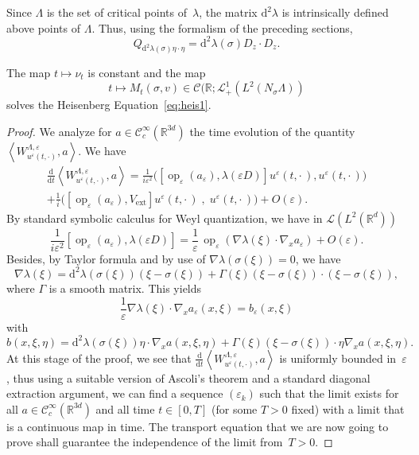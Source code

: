 \documentclass[AHL,Unicode,longabstracts]{cedram}
\DeclareMathOperator{\ext}{ext}
\DeclareMathOperator{\op}{op}
\newcommand*\R{{\mathbb R}}
\newcommand*\eps{\varepsilon}
\numberwithin{equation}{section}
\newcommand*{\dd}{\mathrm{d}}
\newcommand*{\dt}{\dd t}
\begin{document}
Since $\Lambda$ is the set of critical points of~$\lambda$, the matrix $\dd^2 \lambda$ is intrinsically defined above points of $\Lambda$. Thus, using the formalism of the preceding sections,
\[
Q_{\dd^2\lambda(\sigma)\eta\cdot\eta}= \dd^2\lambda(\sigma)D_z\cdot D_z.
\]

\begin{prop}\label{prop5.1}
The map $t\mapsto \nu_t$ is constant and the map
\[
t\mapsto M_t(\sigma,v)\in \mathcal{C}(\R;\mathcal{L}_+^1(L^2(N_\sigma\Lambda))
\]
solves the Heisenberg Equation~\eqref{eq:heis1}.
\end{prop}

\begin{proof}
We analyze for $a\in\mathcal{C}_c^\infty(\R^{3d})$ the time evolution of the quantity\linebreak $\left\langle W^{\Lambda,\eps}_{u^{\eps}(t,\cdot)},a\right\rangle.$ We have
\begin{multline*}
\frac{\dd}{\dt} \left\langle W^{\Lambda,\eps}_{u^{\eps}(t,\cdot)},a\right\rangle=\frac{1}{i\eps^2} \big(\left[\op_\eps(a_\eps),\lambda(\eps D)\right] u^\eps(t,\cdot\,),u^\eps(t,\cdot\,)\big)\\ + \frac{1}{i}
\big(\left[\op_\eps(a_\eps),V_{\ext}\right] u^\eps(t,\cdot\,)\;,\;u^\eps(t,\cdot\,)\big)+O(\eps).
\end{multline*}
By standard symbolic calculus for Weyl quantization, we have in ${\mathcal L}(L^2(\R^d))$
\[
\frac{1}{i\eps^2}\left[\op_\eps(a_\eps),\lambda(\eps D)\right] = \frac{1}{\eps} \,\op_\eps(\nabla\lambda(\xi) \cdot\nabla_x a_\eps) +O(\eps).
\]
Besides, by Taylor formula and by use of $\nabla\lambda (\sigma(\xi))=0$, we have
\begin{equation}\label{taylor_lambda}
\nabla \lambda(\xi) = \dd^2\lambda(\sigma(\xi)) \left(\xi-\sigma(\xi)\right) + \Gamma(\xi) \left(\xi-\sigma(\xi) \right)\cdot\left(\xi-\sigma(\xi)\right),
\end{equation}
where $\Gamma$ is a smooth matrix. This yields
\[
\frac{1}{\eps} \nabla\lambda(\xi) \cdot\nabla_x a_\eps(x,\xi) = b_\eps(x,\xi)
\]
with
\[
b(x,\xi,\eta)=\dd^2\lambda(\sigma(\xi))\eta\cdot \nabla_xa (x,\xi,\eta) + \Gamma(\xi) \left(\xi-\sigma(\xi) \right)\cdot\eta \nabla_x a(x,\xi,\eta).
\]
At this stage of the proof, we see that $\frac{\dd}{\dt} \left\langle W^{\Lambda,\eps}_{u^{\eps}(t,\cdot)},a\right\rangle$ is uniformly bounded in~$\eps$, thus using a suitable version of Ascoli's theorem and a standard diagonal extraction argument, we can find a sequence $(\eps_k)$ such that the limit exists for all $a\in{\mathcal C}_c^\infty(\R^{3d})$ and all time $t\in[0,T]$ (for some $T>0$ fixed) with a limit that is a continuous map in time. The transport equation that we are now going to prove shall guarantee the independence of the limit from~$T>0$.


\end{proof}
\end{document}
